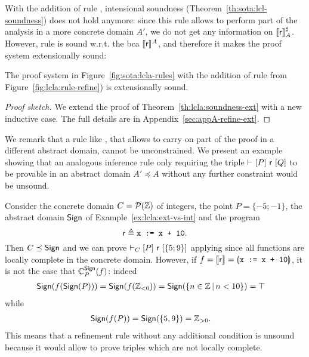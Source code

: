 With the addition of rule , intensional soundness (Theorem~\ref{th:sota:lcl-soundness}) does not hold anymore: since this rule allows to perform part of the analysis in a more concrete domain $A'$, we do not get any information on $\llbracket\mathsf{r}\rrbracket^{\sharp}_A$. However, rule  is sound w.r.t. the bca $\llbracket\mathsf{r}\rrbracket^A$, and therefore it makes the proof system extensionally sound:

\begin{theorem}\label{th:lcla:soundness-rule-refine}
	The proof system in Figure~\ref{fig:sota:lcla-rules} with the addition of rule  from Figure~\ref{fig:lcla:rule-refine}) is extensionally sound.
\end{theorem}
\begin{proof}[Proof sketch]
	We extend the proof of Theorem~\ref{th:lcla:soundness-ext} with a new inductive case. The full details are in Appendix~\ref{sec:appA-refine-ext}.
\end{proof}

We remark that a rule like , that allows to carry on part of the proof in a different abstract domain, cannot be unconstrained. We present an example showing that an analogous inference rule only requiring the triple $\vdash_{}\nobreak[P]~\mathsf{r}~[Q]$ to be provable in an abstract domain $A' \preceq A$ without any further constraint would be unsound.
\begin{example}
	Consider the concrete domain $C = \mathcal{P}(\mathbb{Z})$ of integers, the point $P = \{ -5; -1 \}$, the abstract domain $\mathsf{Sign}$ of Example~\ref{ex:lcla:ext-vs-int} and the program
	\[
	\mathsf{r} \triangleq \texttt{x := x + 10} .
	\]
	Then $C \preceq \mathsf{Sign}$ and we can prove $\vdash_{C}\nobreak[P]~\mathsf{r}~[\{ 5; 9 \}]$ applying  since all functions are locally complete in the concrete domain. However, if $f = \llbracket\mathsf{r}\rrbracket = \llparenthesis\texttt{x := x + 10}\rrparenthesis$, it is not the case that $\mathbb{C}^{\mathsf{Sign}}_{P}(f)$: indeed
	\begin{align*}
		\mathsf{Sign} (f (\mathsf{Sign}(P))) &= \mathsf{Sign} (f(\mathbb{Z}_{< 0})) = \mathsf{Sign}(\{ n \in \mathbb{Z} \,\vert\, n < 10 \}) = \top
	\end{align*}
	while
	\begin{align*}
		\mathsf{Sign}(f(P)) & = \mathsf{Sign}(\{ 5, 9 \}) = \mathbb{Z}_{> 0}.
	\end{align*}
	This means that a refinement rule without any additional condition is unsound because it would allow to prove triples which are not locally complete.
\end{example}

